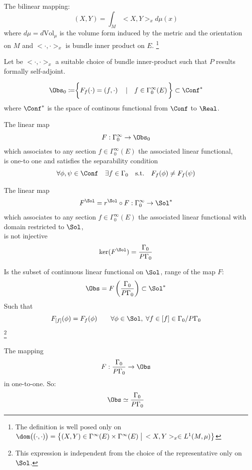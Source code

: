 \documentclass[a4paper,11pt]{scrartcl}
\begin{document}
	\begin{definition}
		The bilinear mapping:
   			$$ (X,Y) = \int_M <X,Y>_x d\mu(x) $$
			where $d\mu = d\textrm{Vol}_\mu$ is the volume form induced by the metric and the orientation on $M$ and $<\cdot,\cdot>_x$ is bundle inner product on $E$.
			\footnote{The definition is well posed only on 
			$ \dom\big( (\cdot, \cdot) \big) =
			 \big\{(X,Y) \in \Gamma^\infty(E) \times \Gamma^\infty(E) \; 
			 \big\vert \,  <X,Y>_x \in L^1(M,\mu)\big \}$}
	\end{definition}
	Let be $<\cdot,\cdot>_x$ a suitable choice of bundle inner-product such that $P$ results formally self-adjoint.
	\begin{definition}
		\begin{displaymath}
			\Obs_0 \coloneqq \biggr\{ F_f (\cdot) = ( f, \cdot ) \quad
			\left\vert\quad  f \in \Gamma_0^\infty(E) \right.	\biggr\} \subset \Conf^* 
		\end{displaymath}
		where $\Conf^* $ is the space of continous functional  from $\Conf$ to $\Real$.
	\end{definition}
	
	\begin{proposition}
		The linear map	 $$ F: \Gamma_0^\infty \rightarrow \Obs_0 $$
		which associates to any section $f\in \Gamma_0^\infty(E)$ the associated linear functional,\\ is one-to one and satisfies the separability condition
				$$ \forall \phi, \psi \in \Conf \quad \exists f \in \Gamma_0 \quad \textrm{s.t.} \quad F_f(\phi) \neq F_f(\psi)$$
	\end{proposition}
		\begin{proposition}
		The linear map	 $$ F^\Sol = r^\Sol \circ F : \Gamma_0^\infty \rightarrow \Sol^* $$
		which associates to any section $f\in \Gamma_0^\infty(E)$ the associated linear functional with domain restricted to $\Sol$,\\
		 is not injective
				$$ \ker(F^\Sol) = \frac{\Gamma_0}{P \Gamma_0}$$
	\end{proposition}
	
	\begin{definition}
		Is the subset of continuous linear functional on $\Sol$, range of the map $F$:
		$$ \Obs = F \left( \frac{\Gamma_0}{P \Gamma_0} \right) \subset \Sol^*$$
		Such that 
		$$   F_{[f]} (\phi) = F_f(\phi) \qquad \forall \phi \in \Sol ,\; \forall f \in [f] \in \Gamma_0 / P \Gamma_0 $$
		\footnote{This expression is independent from the choice of the representative only on $\Sol$.}
	\end{definition}
	\begin{proposition}
	The mapping
	$$ F: \frac{\Gamma_0}{P \Gamma_0} \rightarrow \Obs $$ in one-to-one. So:
	$$ \Obs \simeq \frac{\Gamma_0}{P \Gamma_0}$$
	\end{proposition}
	
\end{document}
